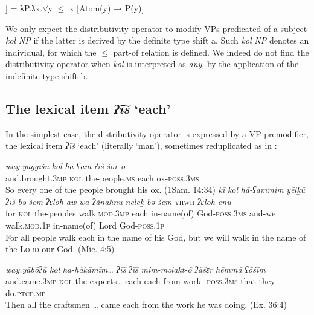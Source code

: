 \documentclass[output=paper]{langsci/langscibook}
\begin{document}
\ea%
    \label{ex:doron:45}\relax
    [[each]]  =   λP.λx.${\forall}$y ${\leq}$ x [Atom(y) → P(y)]
\z


We only expect the distributivity operator to modify VPs predicated of a subject \textit{kol} \textit{NP} if the latter is derived by the definite type shift a. Such \textit{kol} \textit{NP} denotes an individual, for which the ${\leq}$  part-of relation is defined. We indeed do not find the distributivity operator when \textit{kol} is interpreted as \textit{any}, by the application of the indefinite type shift b.

\subsection{The lexical item \textit{ʔīš} ‘each’}%
In the simplest case, the distributivity operator is expressed by a VP-premodifier, the lexical item \textit{ʔīš} ‘each’ (literally ‘man’), sometimes reduplicated as in :

\ea%
    \label{ex:doron:46}
    \ea
    \gll \textit{way.yaggīšū}          \textit{kol}    \textit{hā-ʕām}              \textit{ʔīš}     \textit{šōr-ō}                  \\
         and.brought\textsc{.3mp}   \textsc{kol} the-people.\textsc{ms}   each  ox-\textsc{poss.3ms}   \\
    \glt So every one of the people brought his ox.  (1Sam. 14:34)
    \ex
    \gll \textit{kī}   \textit{kol}    \textit{hā-ʕammim}   \textit{yēlḵū}                   \textit{ʔīš}      \textit{bə-šēm}         \textit{ʔɛlōh-āw} \textit{wa-ʔănaħnū} \textit{nēlēḵ}                \textit{bə-šēm}        \textsc{yhwh}  \textit{ʔɛlōh-ēnū}\\
         for \textsc{kol}   the-peoples   walk.\textsc{mod.3mp}   each   in-name(of)  God-\textsc{poss.3ms} and-we         walk.\textsc{mod.1p}   in-name(of) Lord   God-\textsc{poss.1p}\\
    \glt For all people walk each in the name of his God, but we will walk in the name of the \textsc{Lord} our God. (Mic. 4:5)
    \z
\z


\ea%
    \label{ex:doron:47}
    \gll \textit{way.yāḇōʔū}      \textit{kol}   \textit{ha-ħăḵāmīm…} \textit{ʔīš}     \textit{ʔīš}    \textit{mim-məlaḵt-ō}             \textit{ʔăšɛr}  \textit{hēmmā}  \textit{ʕōśīm}\\
         and.came\textsc{.3mp}  \textsc{kol} the-experts…   each each from-work- \textsc{poss.3ms} that    they       do.\textsc{ptcp.mp}\\
    \glt Then all the craftsmen … came each from the work he was doing. (Ex. 36:4)
    \z
\end{document}
